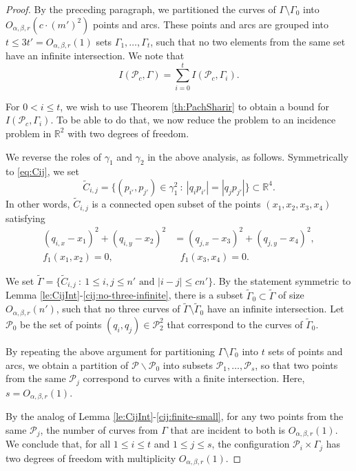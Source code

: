 \documentclass[11pt]{article}
\theoremstyle{definition}
\newcommand{\parag}[1]{\vspace{2mm}
\noindent{\bf #1} }
\newcommand{\RR}{\mathbb R}
\newcommand{\pts}{\mathcal{P}}
\newcommand{\curves}{\Gamma}
\begin{document}
\begin{proof}
By the preceding paragraph, we partitioned the curves of $\curves\setminus\curves_0$ into $O_{\alpha,\beta,r}(c\cdot(m')^2)$ points and arcs.
These points and arcs are grouped into $t\le 3t' = O_{\alpha,\beta,r}(1)$ sets $\curves_1,\ldots,\curves_t$, such that no two elements from the same set have an infinite intersection. 
We note that 
%
\[ I(\pts_c,\curves) = \sum_{i=0}^{t}I(\pts_c,\curves_i). \]
 
\parag{Simplifying the incidence problems.} 
For $0 < i \le t$, we wish to use Theorem \ref{th:PachSharir} to obtain a bound for $I(\pts_c,\curves_i)$.
To be able to do that, we now reduce the problem to an incidence problem in $\RR^2$ with two degrees of freedom.

We reverse the roles of $\gamma_1$ and $\gamma_2$ in the above analysis, as follows.
Symmetrically to \eqref{eq:Cij}, we set  
%
\[ \widetilde{C}_{i,j} = \{(p_{i'},p_{j'})\in \gamma_1^2\ :\ |q_i p_{i'}| = |q_jp_{j'}|\} \subset \RR^4. \]
%
In other words, $\widetilde{C}_{i,j}$ is a connected open subset of the points $(x_1,x_2, x_3,x_4)$ satisfying
 \begin{align*}
 (q_{i,x}-x_1)^2 + (q_{i,y}-x_2)^2 &= (q_{j,x}-x_3)^2 + (q_{j,y}-x_4)^2, \\[2mm]
  f_1(x_1,x_2)=0,&~~~f_1(x_3,x_4)=0.
 \end{align*}
 
We set $\widetilde{\curves} = \{ \widetilde{C}_{i,j}\ :\ 1\leq i,j \leq n' \text{ and } |i-j|\le c n'\}$.
By the statement symmetric to Lemma \ref{le:CijInt}-\ref{cij:no-three-infinite},
 there is a subset $\widetilde{\curves}_0\subset \widetilde{\curves}$ of size $O_{\alpha,\beta,r}(n')$, such that no three curves of $\widetilde{\curves}\setminus \widetilde{\curves}_0$ have an infinite intersection.
Let $\pts_0$ be the set of points $(q_i,q_j)\in \pts_2^2$ 
that correspond to the curves of $\widetilde{\curves}_0$.
 
By repeating the above argument for partitioning $\curves\setminus \curves_0$ into $t$ sets of points and arcs, we obtain a partition of $\pts\backslash \pts_0$ into subsets $\pts_1,\ldots, \pts_s$, so that two points from the same $\pts_j$ correspond to curves with a finite intersection.
Here, $s=O_{\alpha,\beta,r}(1)$.

By the analog of Lemma \ref{le:CijInt}-\ref{cij:finite-small}, for any two points from the same $\pts_j$, the number of curves from $\curves$ that are incident to both is $O_{\alpha,\beta,r}(1)$.  
We conclude that, for all $1\le i \le t$ and $1\le j\le s$,  the configuration $\pts_i\times\curves_j$ has two degrees of freedom with multiplicity $O_{\alpha,\beta,r}(1)$.


\end{proof}
\end{document}
